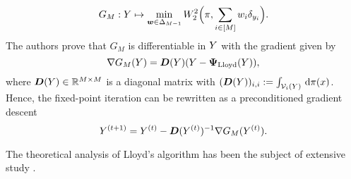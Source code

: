 \begin{equation}
  G_{M}: Y \mapsto \min\limits_{\bm{w} \in \Delta_{M-1}} W_{2}^{2}\Big(\pi, \sum\limits_{i \in [M]} w_{i} \delta_{y_{i}} \Big).
\end{equation}
The authors prove that $G_{M}$ is differentiable in $Y$ with the gradient given by
\begin{equation}\label{eq:gradient_G_M_lloyd}
    \nabla G_{M}(Y) = \bm{D}(Y) (Y - \bm{\Psi}_{\mathrm{Lloyd}}(Y)),
\end{equation}
where $\bm{D}(Y) \in \mathbb{R}^{M \times M}$ is a diagonal matrix with $(\bm{D}(Y))_{i,i} := \int_{\mathcal{V}_{i}(Y)} \,\mathrm{d}\pi(x)$. Hence, the fixed-point iteration can be rewritten as a preconditioned gradient descent
\begin{equation}
    Y^{(t+1)} = Y^{(t)} - \bm{D}(Y^{(t)})^{-1} \nabla G_{M}(Y^{(t)}).
\end{equation}




The theoretical analysis of Lloyd's algorithm has been the subject of extensive study \cite{Kie82,Wu92,DuFaGu99,DuEmJu06,EmJuRa08,PaYu16,PoCaPa24}.  




